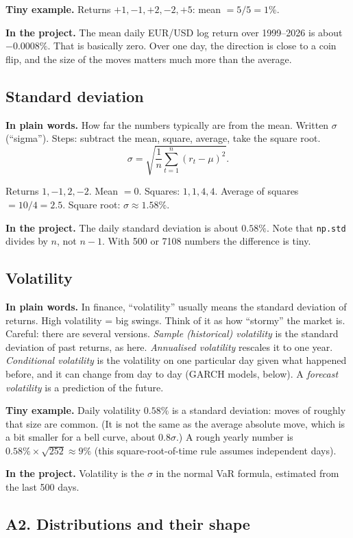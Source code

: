 \documentclass[11pt,a4paper]{article}
\newcommand{\term}[1]{\subsection{#1}}
\newcommand{\plain}{\textbf{In plain words.} }
\newcommand{\inproj}{\textbf{In the project.} }
\newcommand{\tinyex}{\textbf{Tiny example.} }
\newcommand{\code}[1]{\texttt{#1}}
\begin{document}
\tinyex Returns $+1, -1, +2, -2, +5$: mean $= 5/5 = 1\%$.

\inproj The mean daily EUR/USD log return over 1999--2026 is about
$-0.0008\%$. That is basically zero. Over one day, the direction is close to
a coin flip, and the size of the moves matters much more than the average.

\term{Standard deviation}\label{g:std}
\plain How far the numbers typically are from the mean. Written $\sigma$
(``sigma''). Steps: subtract the mean, square, average, take the square root.
\[
  \sigma = \sqrt{\frac{1}{n}\sum_{t=1}^{n}(r_t - \mu)^2}.
\]

\begin{example}
Returns $1, -1, 2, -2$. Mean $=0$. Squares: $1, 1, 4, 4$. Average of squares
$= 10/4 = 2.5$. Square root: $\sigma \approx 1.58\%$.
\end{example}

\inproj The daily standard deviation is about $0.58\%$. Note that
\code{np.std} divides by $n$, not $n-1$. With 500 or 7108 numbers the
difference is tiny.

\term{Volatility}\label{g:vol}
\plain In finance, ``volatility'' usually means the standard deviation of
returns. High volatility = big swings. Think of it as how ``stormy'' the
market is. Careful: there are several versions. \emph{Sample (historical)
volatility} is the standard deviation of past returns, as here.
\emph{Annualised volatility} rescales it to one year. \emph{Conditional
volatility} is the volatility on one particular day given what happened
before, and it can change from day to day (GARCH models, below). A
\emph{forecast volatility} is a prediction of the future.

\tinyex Daily volatility $0.58\%$ is a standard deviation: moves of roughly that
size are common. (It is not the same as the average absolute move, which is
a bit smaller for a bell curve, about $0.8\sigma$.) A rough yearly number is
$0.58\% \times \sqrt{252} \approx 9\%$ (this square-root-of-time rule assumes
independent days).

\inproj Volatility is the $\sigma$ in the normal VaR formula, estimated
from the last 500 days.

\subsection*{A2. Distributions and their shape}
\end{document}
